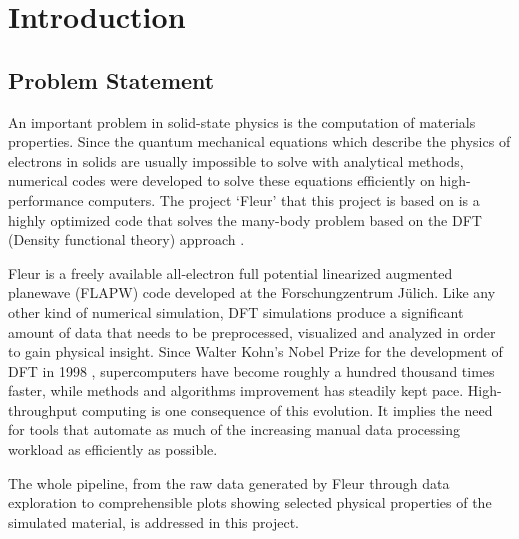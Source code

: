 
\chapter{Introduction}
\label{chap:intro}

\section{Problem Statement}
\label{sec:problem-statement}

An important problem in solid-state physics is the computation of materials properties. Since the quantum mechanical equations which describe the physics of electrons in solids are usually impossible to solve with analytical methods, numerical codes were developed to solve these equations efficiently on high-performance computers. The project `Fleur' that this project is based on is a highly optimized code that solves the many-body problem based on the DFT (Density functional theory) approach \cite{fleur}.

Fleur is a freely available all-electron full potential linearized augmented planewave (FLAPW) code developed at the Forschungzentrum Jülich. Like any other kind of numerical simulation, DFT simulations produce a significant amount of data that needs to be preprocessed, visualized and analyzed in order to gain physical insight. Since Walter Kohn's Nobel Prize for the development of DFT in 1998 \cite{kohn-nobel}, supercomputers have become roughly a hundred thousand times faster\cite{top500}, while methods and algorithms improvement has steadily kept pace. High-throughput computing is one consequence of this evolution. It implies the need for tools that automate as much of the increasing manual data processing workload as efficiently as possible.

The whole pipeline, from the raw data generated by Fleur through data exploration to comprehensible plots showing selected physical properties of the simulated material, is addressed in this project.



